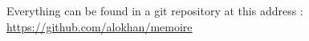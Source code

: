 Everything can be found in a git repository at this address : \url{https://github.com/alokhan/memoire}
